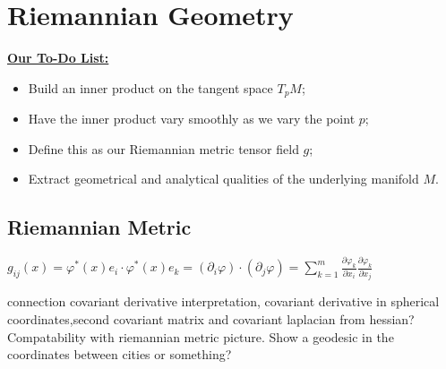 \documentclass[UKenglish]{beamer}
\begin{document}
\begin{frame}{}
\vfill
\begin{figure}[H]
	\centering
	\def\svgwidth{\columnwidth}
	
\end{figure}
\vfill
\end{frame}

\begin{frame}{}
\vfill
\begin{figure}[H]
	\centering
	\def\svgwidth{\columnwidth}
	
\end{figure}
\vfill
\end{frame}

\section{Riemannian Geometry}

\begin{frame}{}
\vfill
\textbf{\underline{Our To-Do List:}}
\begin{itemize}
	\item Build an inner product on the tangent space $T_pM$;
	\pause
	\item Have the inner product vary smoothly as we vary the point $p$;
	\pause
	\item Define this as our Riemannian metric tensor field $g$;
	\pause
	\item Extract geometrical and analytical qualities of the underlying manifold $M$.
\end{itemize}
\vfill
\end{frame}


\subsection{Riemannian Metric}

\begin{frame}{}
\vfill
$g_{ij}(x) = \varphi^*(x)e_i \cdot \varphi^*(x)e_k = (\partial_i \varphi)\cdot (\partial_j \varphi) = \sum_{k=1}^m \frac{\partial \varphi_k}{\partial x_i}\frac{\partial \varphi_k}{\partial x_j}$
\vfill
\end{frame}

\begin{frame}{}
connection covariant derivative interpretation, covariant derivative in spherical coordinates,second covariant matrix and covariant laplacian from hessian? Compatability with riemannian metric picture. Show a geodesic in the coordinates between cities or something?
\end{frame}
\end{document}
